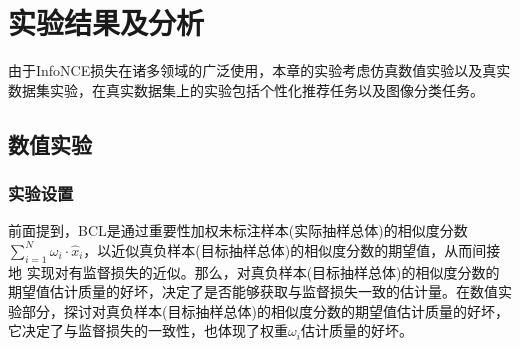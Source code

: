 
\section{实验结果及分析}
由于InfoNCE损失在诸多领域的广泛使用，本章的实验考虑仿真数值实验以及真实数据集实验，在真实数据集上的实验包括个性化推荐任务以及图像分类任务。
\subsection{数值实验}
\subsubsection{实验设置}
\newpage
前面提到，BCL是通过重要性加权未标注样本(实际抽样总体)的相似度分数$\sum_{i=1}^N \omega_i \cdot \hat{x}_i$，以近似真负样本(目标抽样总体)的相似度分数的期望值，从而间接地
实现对有监督损失的近似。那么，对真负样本(目标抽样总体)的相似度分数的期望值估计质量的好坏，决定了是否能够获取与监督损失一致的估计量。在数值实验部分，探讨对真负样本(目标抽样总体)的相似度分数的期望值估计质量的好坏，它决定了与监督损失的一致性，也体现了权重$\omega_i$估计质量的好坏。

